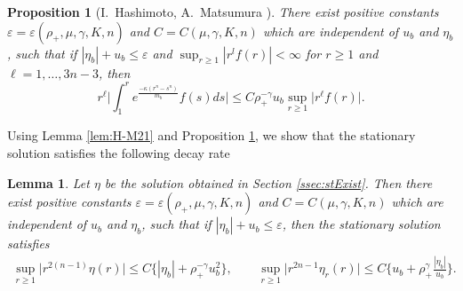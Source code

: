 \documentclass[a4paper,12pt,draft]{article}
\newtheorem{lemma}[theorem]{Lemma}
\newtheorem{proposition}[theorem]{Proposition}
\theoremstyle{remark}
\def\ep{\varepsilon}
\begin{document}
\begin{proposition}[I.~Hashimoto, A.~Matsumura \cite{h-m21}] \label{prop:H-M}
There exist positive constants $\ep=\ep(\rho_+,\mu,\gamma,K,n)$ and $C=C(\mu,\gamma,K,n)$ which are independent of $u_b$ and $\eta_b$, such that if $|\eta_b|+u_b \le \ep$ and $\sup_{r\ge 1}| r^{l} f(r)|< \infty$ for $r\ge 1$ and $\ell =1,\dotsc, 3n-3$, then
    \begin{equation*}
        r^{\ell} \bigg| \int_{1}^r e^{\frac{-\kappa(r^n-s^n)}{m_b}} f(s) ds \bigg| \le C \rho_{+}^{-\gamma} u_b \sup\limits_{r\ge 1} \big| r^{\ell} f(r) \big|.
    \end{equation*}
\end{proposition}
Using Lemma \ref{lem:H-M21} and Proposition \ref{prop:H-M}, we show that the stationary solution satisfies the following decay rate
\begin{lemma}\label{lemma:etaEst}
    Let $\eta$ be the solution obtained in Section \ref{ssec:stExist}. Then there exist positive constants $\ep=\ep(\rho_+,\mu,\gamma,K,n)$ and $C=C(\mu,\gamma,K,n)$ which are independent of $u_b$ and $\eta_b$, such that if $|\eta_b|+ u_b\le \ep$, then %
    the stationary solution satisfies
    \begin{gather}
        \sup\limits_{r\ge 1}\big|r^{2(n-1)}\eta(r)\big|\le C\big\{ |\eta_b| + \rho_{+}^{-\gamma} u_b^2  \big\}, \qquad 
        \sup\limits_{r\ge 1}\big|r^{2n-1}\eta_r(r)\big| %
        \le C \Big\{ u_b + \rho_{+}^{\gamma} \frac{|\eta_b|}{u_b} \Big\}. \label{etaEst1}
    \end{gather}
\end{lemma}
\end{document}
